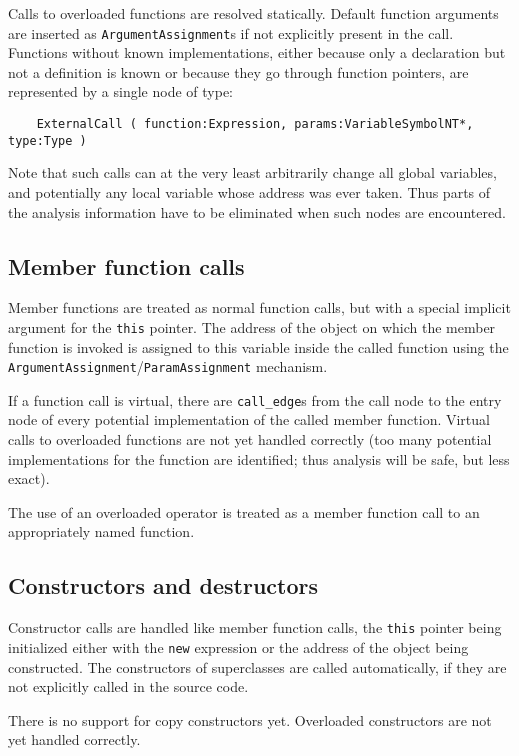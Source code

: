 \documentclass[12pt]{article}
\begin{document}
Calls to overloaded functions are resolved statically. Default
function arguments are inserted as \verb|ArgumentAssignment|s if not
explicitly present in the call. Functions without known
implementations, either because only a declaration but not a
definition is known or because they go through function pointers,
are represented by a single node of type:
\begin{verbatim}
    ExternalCall ( function:Expression, params:VariableSymbolNT*, type:Type )
\end{verbatim}
Note that such calls can at the very least arbitrarily change all
global variables, and potentially any local variable whose address
was ever taken. Thus parts of the analysis information have to be
eliminated when such nodes are encountered.

\subsection{Member function calls}

Member functions are treated as normal function calls, but with a
special implicit argument for the \lstinline|this| pointer. The
address of the object on which the member function is invoked is
assigned to this variable inside the called function using the
\verb|ArgumentAssignment|/\verb|ParamAssignment| mechanism.

If a function call is virtual, there are \verb|call_edge|s from the
call node to the entry node of every potential implementation of
the called member function. Virtual calls to overloaded functions
are not yet handled correctly (too many potential implementations
for the function are identified; thus analysis will be safe, but
less exact).

The use of an overloaded operator is treated as a member function
call to an appropriately named function.

\subsection{Constructors and destructors}

Constructor calls are handled like member function calls, the
\lstinline|this| pointer being initialized either with the
\lstinline|new| expression or the address of the object being
constructed. The constructors of superclasses are called
automatically, if they are not explicitly called in the source code.

There is no support for copy constructors yet. Overloaded
constructors are not yet handled correctly.
\end{document}
